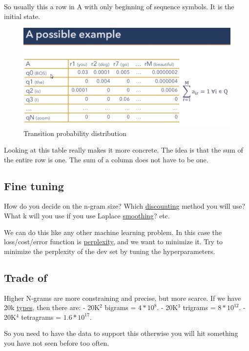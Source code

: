 \documentclass[
  11pt,
  british,
]{article}
\begin{document}
So usually this a row in A with only beginning of sequence symbols. It
is the initial state.

\begin{figure}
\centering
\includegraphics{Pasted_image_20220223185953.png}
\caption{Transition probability distribution}
\end{figure}

Looking at this table really makes it more concrete. The idea is that
the sum of the entire row is one. The sum of a column does not have to
be one.

\hypertarget{fine-tuning}{%
\subsection{Fine tuning}\label{fine-tuning}}

How do you decide on the n-gram size? Which
\href{Smoothing.md}{discounting} method you will use? What k will you
use if you use Laplace \href{Smoothing.md}{smoothing}? etc.

We can do this like any other machine learning problem. In this case the
loss/cost/error function is \href{Perplexity.md}{perplexity}, and we
want to minimize it. Try to minimize the perplexity of the dev set by
tuning the hyperparameters.

\hypertarget{trade-of}{%
\subsection{Trade of}\label{trade-of}}

Higher N-grams are more constraining and precise, but more scarce. If we
have 20k \href{../Data/Type.md}{types}, then there are: - 20K\(^2\)
bigrams = \(4*10^8\). - 20K\(^{3}\) trigrams = \(8 * 10^{12}\). -
20K\(^{4}\) tetragrams = \(1.6 * 10^{17}\).

So you need to have the data to support this otherwise you will hit
something you have not seen before too often.
\end{document}
